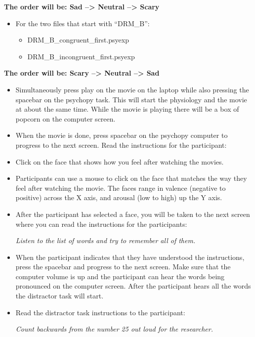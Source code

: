 \documentclass[]{book}
\providecommand{\tightlist}{%
  \setlength{\itemsep}{0pt}\setlength{\parskip}{0pt}}
\begin{document}
\textbf{The order will be: Sad --\textgreater{} Neutral --\textgreater{} Scary}

\begin{itemize}
\tightlist
\item
  For the two files that start with ``DRM\_B'':

  \begin{itemize}
  \tightlist
  \item
    DRM\_B\_congruent\_first.psyexp
  \item
    DRM\_B\_incongruent\_first.psyexp
  \end{itemize}
\end{itemize}

\textbf{The order will be: Scary --\textgreater{} Neutral --\textgreater{} Sad}

\begin{itemize}
\item
  Simultaneously press play on the movie on the laptop while also pressing the spacebar on the psychopy task. This will start the physiology and the movie at about the same time. While the movie is playing there will be a box of popcorn on the computer screen.
\item
  When the movie is done, press spacebar on the psychopy computer to progress to the next screen. Read the instructions for the participant:
\item
  Click on the face that shows how you feel after watching the movies.
\item
  Participants can use a mouse to click on the face that matches the way they feel after watching the movie. The faces range in valence (negative to positive) across the X axis, and arousal (low to high) up the Y axis.
\item
  After the participant has selected a face, you will be taken to the next screen where you can read the instructions for the participants:

  \emph{Listen to the list of words and try to remember all of them.}
\item
  When the participant indicates that they have understood the instructions, press the spacebar and progress to the next screen. Make sure that the computer volume is up and the participant can hear the words being pronounced on the computer screen. After the participant hears all the words the distractor task will start.
\item
  Read the distractor task instructions to the participant:

  \emph{Count backwards from the number 25 out loud for the researcher.}
\end{itemize}
\end{document}
